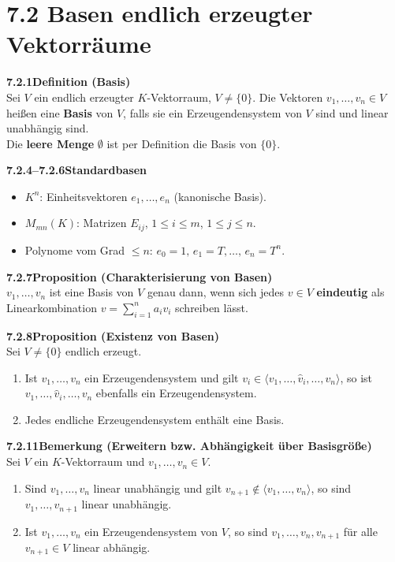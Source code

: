 \documentclass[a4paper,12pt]{article}
\newcommand{\gentry}[3]{%
  \noindent\textbf{#1\quad #2}\nopagebreak\\[0.2em]
  #3\par\smallskip
}
\begin{document}
\section*{7.2 \quad Basen endlich erzeugter Vektorräume}

\gentry{7.2.1}{Definition (Basis)}{%
  Sei $V$ ein endlich erzeugter $K$-Vektorraum, $V \neq \{0\}$. Die Vektoren
  $v_1,\ldots,v_n \in V$ heißen eine \textbf{Basis} von $V$, falls sie ein
  Erzeugendensystem von $V$ sind und linear unabhängig sind.
  \smallskip\\
  Die \textbf{leere Menge} $\emptyset$ ist per Definition die Basis von $\{0\}$.
}

\gentry{7.2.4--7.2.6}{Standardbasen}{%
  \begin{itemize}[topsep=2pt,itemsep=1pt]
    \item $K^n$: Einheitsvektoren $e_1,\ldots,e_n$ (kanonische Basis).
    \item $M_{mn}(K)$: Matrizen $E_{ij}$, $1 \le i \le m$, $1 \le j \le n$.
    \item Polynome vom Grad $\le n$: $e_0 = 1,\, e_1 = T,\ldots,\, e_n = T^n$.
  \end{itemize}
}

\gentry{7.2.7}{Proposition (Charakterisierung von Basen)}{%
  $v_1,\ldots,v_n$ ist eine Basis von $V$ genau dann, wenn sich jedes
  $v \in V$ \textbf{eindeutig} als Linearkombination $v = \sum_{i=1}^n a_i v_i$
  schreiben lässt.
}

\gentry{7.2.8}{Proposition (Existenz von Basen)}{%
  Sei $V \neq \{0\}$ endlich erzeugt.
  \begin{enumerate}[label=(\alph*),topsep=2pt,itemsep=1pt]
    \item Ist $v_1,\ldots,v_n$ ein Erzeugendensystem und gilt
          $v_i \in \langle v_1,\ldots,\hat{v}_i,\ldots,v_n\rangle$, so ist
          $v_1,\ldots,\hat{v}_i,\ldots,v_n$ ebenfalls ein Erzeugendensystem.
    \item Jedes endliche Erzeugendensystem enthält eine Basis.
  \end{enumerate}
}

\gentry{7.2.11}{Bemerkung (Erweitern bzw. Abhängigkeit über Basisgröße)}{%
  Sei $V$ ein $K$-Vektorraum und $v_1,\ldots,v_n \in V$.
  \begin{enumerate}[label=(\alph*),topsep=2pt,itemsep=1pt]
    \item Sind $v_1,\ldots,v_n$ linear unabhängig und gilt
          $v_{n+1} \notin \langle v_1,\ldots,v_n\rangle$, so sind
          $v_1,\ldots,v_{n+1}$ linear unabhängig.
    \item Ist $v_1,\ldots,v_n$ ein Erzeugendensystem von $V$, so sind
          $v_1,\ldots,v_n,v_{n+1}$ für alle $v_{n+1} \in V$ linear abhängig.
  \end{enumerate}
}
\end{document}
